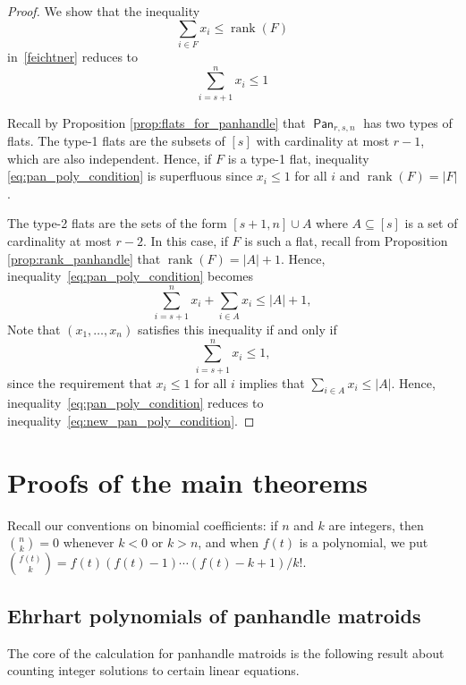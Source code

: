 \documentclass[11pt]{amsart}
\theoremstyle{definition}
\newcommand{\0}{\emptyset}
\DeclareMathOperator{\Pan}{\mathsf{Pan}} %
\DeclareMathOperator{\rank}{\operatorname{rank}}
\begin{document}
\begin{proof}
We show that the inequality
\begin{equation}\label{eq:pan_poly_condition}
    \displaystyle\sum_{i\in F} x_i \leq \rank(F)
\end{equation} in~\eqref{feichtner} reduces to
\begin{equation}\label{eq:new_pan_poly_condition}
    \displaystyle \sum_{i=s+1}^n x_i \leq 1
\end{equation}

Recall by Proposition \ref{prop:flats_for_panhandle} that $\Pan_{r,s,n}$ has two types of flats.
The type-1 flats are the subsets of $[s]$ with cardinality at most $r-1$, which are also independent.
Hence, if $F$ is a type-1 flat, inequality \eqref{eq:pan_poly_condition} is superfluous since  $x_i\leq 1$ for all $i$ and $\rank(F)=|F|$.

The type-2 flats are the sets of the form $[s+1,n]\cup A$ where $A\subseteq [s]$ is a set of cardinality at most $r-2$.
In this case, if $F$ is such a flat, recall from Proposition \ref{prop:rank_panhandle} that $\rank(F)=|A|+1$.
Hence, inequality~\eqref{eq:pan_poly_condition} becomes
\[
\sum_{i=s+1}^nx_i+\sum_{i\in A}x_i\leq |A|+1,
\]
Note that $(x_1,\dots, x_n)$ satisfies this inequality if and only if
\[\sum_{i=s+1}^nx_i\leq 1,\]
since the requirement that $x_i\leq 1$ for all $i$ implies that $\displaystyle \sum_{i\in A}x_i\leq |A|$.
Hence, inequality~\eqref{eq:pan_poly_condition} reduces to inequality~\eqref{eq:new_pan_poly_condition}.
\end{proof}


\section{Proofs of the main theorems} \label{sec:ehrhart}

Recall our conventions on binomial coefficients: if $n$ and $k$ are integers, then $\binom{n}{k}=0$ whenever $k<0$ or $k>n$, and when $f(t)$ is a polynomial, we put $\binom{f(t)}{k}=f(t)(f(t)-1)\cdots (f(t)-k+1)/k!$.


\subsection{Ehrhart polynomials of panhandle matroids}

The core of the calculation for panhandle matroids is the following result about counting integer solutions to certain linear equations.
\end{document}
